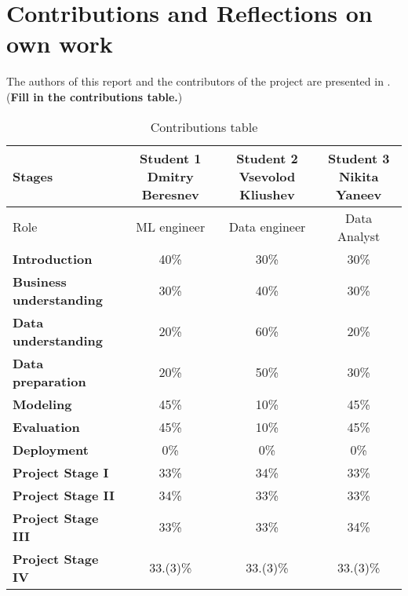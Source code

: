 \section{Contributions and Reflections on own work }
\label{chap:contributionsAndReflectionOnOwnWork}

The authors of this report and the contributors of the project are presented in . (\textbf{Fill in the contributions table.})


\begin{table}[h!]
\footnotesize
    \centering
    \begin{tabular}{|l||c|c|c|}
\toprule
 Stages & \begin{minipage}{0.2\textwidth} Student 1 Dmitry Beresnev \end{minipage} & \begin{minipage}{0.2\textwidth} Student 2 Vsevolod Kliushev\end{minipage} & \begin{minipage}{0.2\textwidth} Student 3 Nikita Yaneev \end{minipage} \\
 \midrule
 Role & ML engineer & Data engineer & Data Analyst \\
 \midrule
 \textbf{Introduction} & 40\% & 30\% & 30\%  \\
 \textbf{Business understanding} & 30\% & 40\% & 30\% \\
 \textbf{Data understanding} & 20\% & 60\% & 20\% \\
 \textbf{Data preparation} & 20\% & 50\% & 30\% \\
 \textbf{Modeling} & 45\% & 10\% & 45\% \\
 \textbf{Evaluation} & 45\% & 10\% & 45\% \\
 \textbf{Deployment} & 0\%& 0\% & 0\% \\
 \midrule
\textbf{Project Stage I} & 33\% & 34\% & 33\% \\
\textbf{Project Stage II} & 34\% & 33\% & 33\% \\
\textbf{Project Stage III} & 33\% & 33\% & 34\% \\
\textbf{Project Stage IV} & 33.(3)\% & 33.(3)\% & 33.(3)\% \\
 \bottomrule
    \end{tabular}
    \caption{Contributions table}
    \label{tab:contributions}
\end{table}


